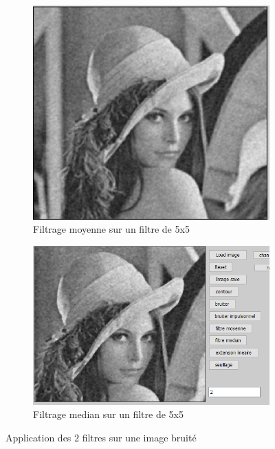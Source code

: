 \documentclass[12pt, letterpaper]{article}
\begin{document}
\begin{figure}[h!]
    \centering
    \begin{subfigure}[b]{0.7\linewidth}
      \includegraphics[width=\linewidth]{img/fig9.PNG}
      \caption{Filtrage moyenne sur un filtre de 5x5}
    \end{subfigure}
    \begin{subfigure}[b]{0.7\linewidth}
      \includegraphics[width=\linewidth]{img/fig10.PNG}
      \caption{Filtrage median sur un filtre de 5x5}
    \end{subfigure}
    \caption{Application des 2 filtres sur une image bruité}
    \label{fig:contour1}
\end{figure}
\end{document}
